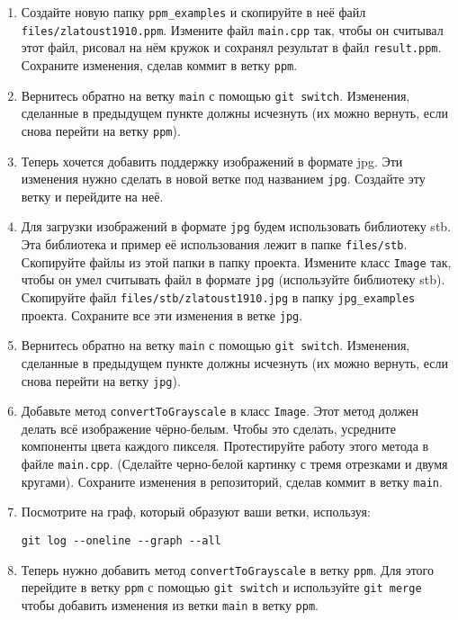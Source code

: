 \documentclass{article}
\begin{document}
\begin{enumerate}
\item Создайте новую папку \texttt{ppm\_examples} и скопируйте в неё файл \texttt{files/zlatoust1910.ppm}. Измените файл \texttt{main.cpp} так, чтобы он считывал этот файл, рисовал на нём кружок и сохранял результат в файл \texttt{result.ppm}. Сохраните изменения, сделав коммит в ветку \texttt{ppm}. 

\item Вернитесь обратно на ветку \texttt{main} с помощью \texttt{git switch}. Изменения, сделанные в предыдущем пункте должны исчезнуть (их можно вернуть, если снова перейти на ветку \texttt{ppm}).

\item Теперь хочется добавить поддержку изображений в формате jpg. Эти изменения нужно сделать в новой ветке под названием \texttt{jpg}. Создайте эту ветку и перейдите на неё.

\item Для загрузки изображений в формате \texttt{jpg} будем использовать библиотеку stb. Эта библиотека и пример её использования лежит в папке \texttt{files/stb}. Скопируйте файлы из этой папки в папку проекта. Измените класс \texttt{Image} так, чтобы он умел считывать файл в формате \texttt{jpg} (используйте библиотеку stb). Скопируйте файл \texttt{files/stb/zlatoust1910.jpg} в папку \texttt{jpg\_examples} проекта. Сохраните все эти изменения в ветке \texttt{jpg}.

\item Вернитесь обратно на ветку \texttt{main} с помощью \texttt{git switch}. Изменения, сделанные в предыдущем пункте должны исчезнуть (их можно вернуть, если снова перейти на ветку \texttt{jpg}).

\item Добавьте метод \texttt{convertToGrayscale} в класс \texttt{Image}. Этот метод должен делать всё изображение чёрно-белым. Чтобы это сделать, усредните компоненты цвета каждого пикселя. Протестируйте работу этого метода в файле \texttt{main.cpp}. (Сделайте черно-белой картинку с тремя отрезками и двумя кругами). Сохраните изменения в репозиторий, сделав коммит в ветку \texttt{main}.

\item Посмотрите на граф, который образуют ваши ветки, используя:
\begin{verbatim}
git log --oneline --graph --all
\end{verbatim}

\item Теперь нужно добавить метод \texttt{convertToGrayscale} в ветку \texttt{ppm}. Для этого перейдите в ветку \texttt{ppm} с помощью \texttt{git switch} и используйте \texttt{git merge} чтобы добавить изменения из ветки \texttt{main} в ветку \texttt{ppm}.


\end{enumerate}
\end{document}
